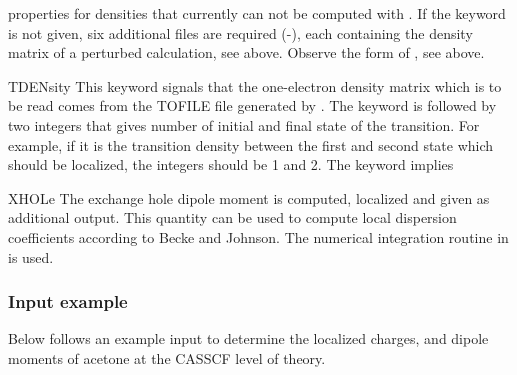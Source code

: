 \begin{keywordlist}
properties for densities that currently can not be computed with \molcas.
If the keyword  is not given, six additional files are
required (-), each containing the density matrix of
a perturbed calculation, see above. Observe the form
of , see above.
\item[TDENsity]
This keyword signals that the one-electron density matrix which is to
be read comes from the TOFILE file generated by . The
keyword is followed by two integers that gives number of initial and
final state of the transition. For example, if it is the transition
density between the first and second state which should be localized,
the integers should be 1 and 2. The keyword implies 
\item[XHOLe]
The exchange hole dipole moment is computed, localized and given
as additional output.
This quantity can be used to compute local dispersion coefficients
according to Becke and Johnson.\cite{Becke:05} The numerical integration
routine in \molcas is used.
\end{keywordlist}

\subsubsection{Input example}
Below follows an example input to determine the localized charges, and dipole
moments of acetone at the CASSCF level of theory.

